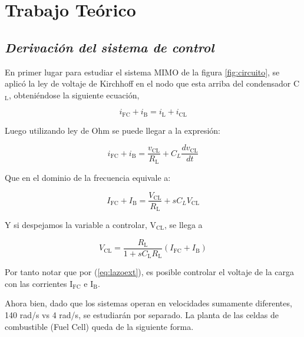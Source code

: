 \section{Trabajo Teórico}

\subsection{\textit{Derivación del sistema de control}}

En primer lugar para estudiar el sistema MIMO de la figura \ref{fig:circuito}, se aplicó 
la ley de voltaje de Kirchhoff en el nodo que esta arriba del condensador C$_{\text{L}}$, 
obteniéndose la siguiente ecuación,

\begin{equation}
    i_{\text{FC}} + i_{\text{B}} = i_{\text{L}} + i_{\text{CL}}
\end{equation}

Luego utilizando ley de Ohm se puede llegar a la expresión:

\begin{equation}
    i_{\text{FC}} + i_{\text{B}} = \frac{v_{\text{CL}}}{R_{\text{L}}} + C_{L}\frac{dv_{\text{CL}}}{dt}
\end{equation}

Que en el dominio de la frecuencia equivale a:

\begin{equation}
    I_{\text{FC}} + I_{\text{B}} = \frac{V_{\text{CL}}}{R_{\text{L}}} + sC_{L}V_{\text{CL}}
\end{equation}

Y si despejamos la variable a controlar, V$_{\text{CL}}$, se llega a

\begin{equation}
    V_{\text{CL}} = \frac{R_{\text{L}}}{1+sC_{\text{L}}R_{\text{L}}}(I_{\text{FC}}+I_{\text{B}})
    \label{eq:lazoext}
\end{equation}

Por tanto notar que por (\ref{eq:lazoext}), es posible controlar el voltaje de la carga con las corrientes I$_{\text{FC}}$ e I$_{\text{B}}$.

Ahora bien, dado que los sistemas operan en velocidades sumamente diferentes, 140 rad/s vs 4 rad/s,
se estudiarán por separado. La planta de las celdas de combustible (Fuel Cell) queda de la siguiente
forma.

\begin{center}
\end{center}

